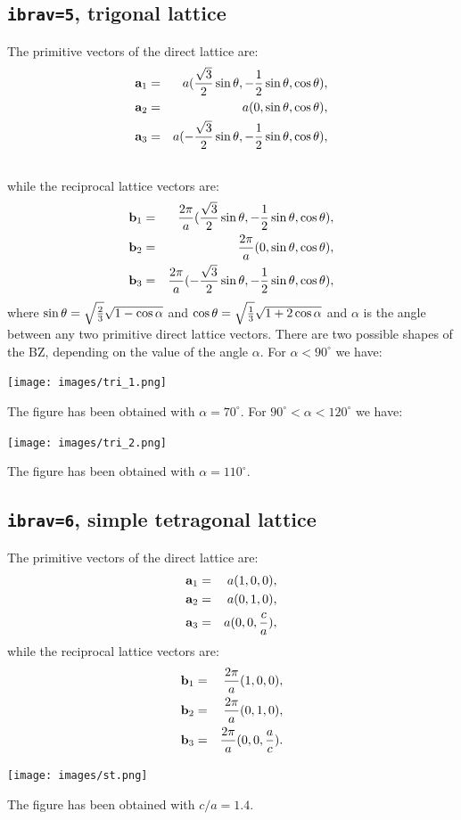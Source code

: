 \documentclass[12pt,a4paper]{article}
\begin{document}
\subsection{\texttt{ibrav=5}, trigonal lattice}

The primitive vectors of the direct lattice are:
\begin{eqnarray}
{\bf a}_1 &=& a ({\sqrt{3}\over 2}\sin{\theta}, -{1\over 2} \sin{\theta},
          \cos{\theta}), 
\nonumber \\
{\bf a}_2 &=& a (0, \sin{\theta}, \cos{\theta}), 
\nonumber \\
{\bf a}_3 &=& a (-{\sqrt{3}\over 2} \sin{\theta}, -{1\over 2} \sin{\theta},
         \cos{\theta}), 
\nonumber \\
\nonumber
\end{eqnarray}
while the reciprocal lattice vectors are:
\begin{eqnarray}
{\bf b}_1 &=& {2\pi \over a} ({\sqrt{3}\over 2} \sin{\theta}, 
-{1 \over 2} \sin{\theta}, \cos{\theta}), \nonumber \\
{\bf b}_2 &=& {2\pi \over a} (0, 
\sin{\theta}, \cos{\theta}), \nonumber \\
{\bf b}_3 &=& {2\pi \over a} (-{\sqrt{3}\over 2} \sin{\theta}, 
-{1 \over 2} \sin{\theta}, \cos{\theta}), \nonumber 
\end{eqnarray}
where $\sin{\theta}=\sqrt{2\over 3}\sqrt{1-\cos{\alpha}}$
and $\cos{\theta}=\sqrt{1\over 3}\sqrt{1 + 2 \cos{\alpha}}$ and $\alpha$
is the angle between any two primitive direct lattice vectors.
There are two possible shapes of the BZ, depending on the
value of the angle $\alpha$. For $\alpha < 90^\circ$ we
have:
\begin{center}
\texttt{[image: images/tri\_1.png]}
\end{center}
The figure has been obtained with $\alpha=70^\circ$.
For $90^\circ < \alpha < 120^\circ$ we have:
\begin{center}
\texttt{[image: images/tri\_2.png]}
\end{center}
The figure has been obtained with $\alpha=110^\circ$.

\subsection{\texttt{ibrav=6}, simple tetragonal lattice}
The primitive vectors of the direct lattice are:
\begin{eqnarray}
{\bf a}_1 &=& a (1, 0, 0), \nonumber \\
{\bf a}_2 &=& a (0, 1, 0), \nonumber \\
{\bf a}_3 &=& a (0, 0, {c\over a}), \nonumber
\nonumber
\end{eqnarray}
while the reciprocal lattice vectors are:
\begin{eqnarray}
{\bf b}_1 &=& {2\pi \over a} (1, 0, 0), \nonumber \\
{\bf b}_2 &=& {2\pi \over a} (0, 1, 0), \nonumber \\
{\bf b}_3 &=& {2\pi \over a} (0, 0, {a\over c}). \nonumber
\nonumber
\end{eqnarray}
\begin{center}
\texttt{[image: images/st.png]}
\end{center}
The figure has been obtained with $c/a=1.4$.
\end{document}
